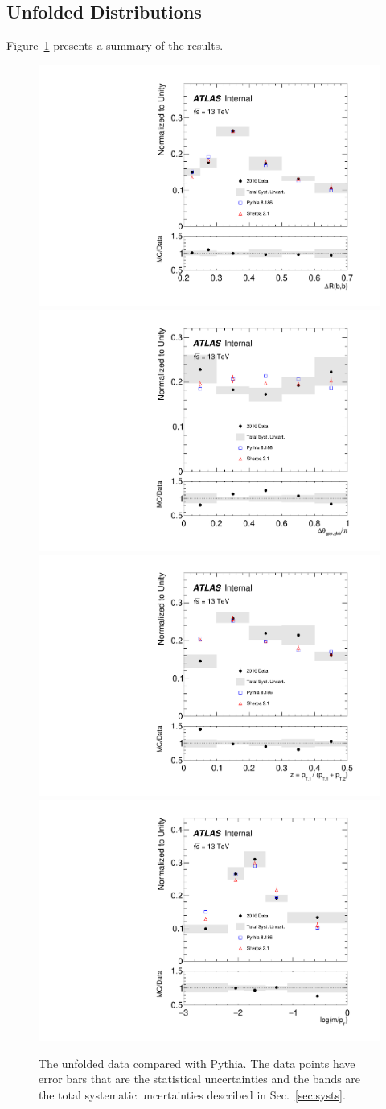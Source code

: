\subsection{Unfolded Distributions}
\label{sec:gbb-results}

Figure~\ref{fig:gbb-results} presents a summary of the results.

\begin{figure}[htpb!]
\begin{center}
  \includegraphics[width=0.45\linewidth]{figures/gbb/Unfolding/dR_unfolded_data.pdf}
  \includegraphics[width=0.45\linewidth]{figures/gbb/Unfolding/dphi_unfolded_data.pdf}\\
  \includegraphics[width=0.45\linewidth]{figures/gbb/Unfolding/ZpT_unfolded_data.pdf}
  \includegraphics[width=0.45\linewidth]{figures/gbb/Unfolding/fracmasspt_unfolded_data.pdf}
\caption[]{The unfolded data compared with Pythia. The data points have error bars that are the statistical uncertainties and the bands are the total systematic uncertainties described in Sec.~\ref{sec:systs}.} 
\label{fig:gbb-results}
\end{center}
\end{figure}

